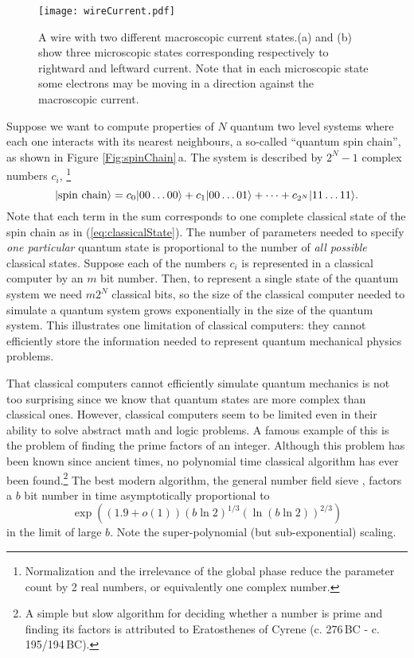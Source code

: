 \begin{figure}
\begin{centering}
\texttt{[image: wireCurrent.pdf]}
\par\end{centering}
\caption{A wire with two different macroscopic current states.(a) and (b) show three microscopic states corresponding respectively to rightward and leftward current. Note that in each microscopic state some electrons may be moving in a direction against the macroscopic current.}
\label{Fig:wireCurrent}
\end{figure}

Suppose we want to compute properties of $N$ quantum two level systems where each one interacts with its nearest neighbours, a so-called ``quantum spin chain'', as shown in Figure \ref{Fig:spinChain}\,a.
The system is described by $2^N - 1$ complex numbers $c_i$, \footnote{Normalization and the irrelevance of the global phase reduce the parameter count by 2 real numbers, or equivalently one complex number.} \begin{equation}
|\textrm{spin chain}\rangle = c_0 |00 \ldots 00\rangle + c_1 |00 \ldots 01\rangle + \cdots + c_{2^N} |11 \ldots 11\rangle \label{eq:quantumState}. \end{equation}
Note that each term in the sum corresponds to one complete classical state of the spin chain as in (\ref{eq:classicalState}).
The number of parameters needed to specify \emph{one particular} quantum state is proportional to the number of \emph{all possible} classical states.
Suppose each of the numbers $c_i$ is represented in a classical computer by an $m$ bit number.
Then, to represent a single state of the quantum system we need $m 2^N$ classical bits, so the size of the classical computer needed to simulate a quantum system grows exponentially in the size of the quantum system.
This illustrates one limitation of classical computers: they cannot efficiently store the information needed to represent quantum mechanical physics problems.

That classical computers cannot efficiently simulate quantum mechanics is not too surprising since we know that quantum states are more complex than classical ones.
However, classical computers seem to be limited even in their ability to solve abstract math and logic problems.
A famous example of this is the problem of finding the prime factors of an integer.
Although this problem has been known since ancient times, no polynomial time classical algorithm has ever been found.\footnote{A simple but slow algorithm for deciding whether a number is prime and finding its factors is attributed to Eratosthenes of Cyrene (c. 276\,BC - c. 195/194\,BC).}
The best modern algorithm, the general number field sieve \cite{Lenstra:sieve1993}, factors a $b$ bit number in time asymptotically proportional to \begin{equation}
\exp \left( \left( 1.9 + o(1) \right) (b\ln 2)^{1/3}(\ln (b\ln 2))^{2/3} \right) \end{equation}
in the limit of large $b$. Note the super-polynomial (but sub-exponential) scaling.

